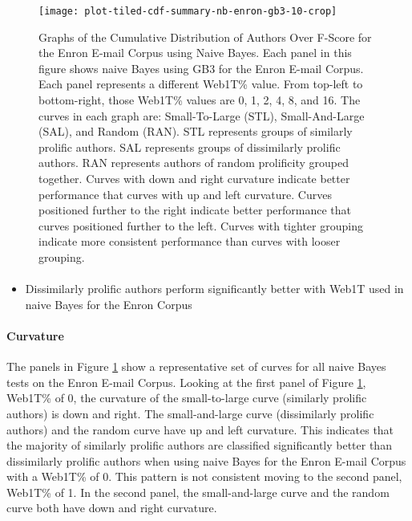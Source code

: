 	\begin{figure}[htbp!]
		\begin{center}
		\centering
		\texttt{[image: plot-tiled-cdf-summary-nb-enron-gb3-10-crop]}
		\caption{Graphs of the Cumulative Distribution of Authors Over F-Score for the Enron E-mail Corpus using Naive Bayes. Each panel in this figure shows naive Bayes using GB3 for the Enron E-mail Corpus.  Each panel represents a different Web1T\% value.  From top-left to bottom-right, those Web1T\% values are 0, 1, 2, 4, 8, and 16.  The curves in each graph are: Small-To-Large (STL), Small-And-Large (SAL), and Random (RAN).  STL represents groups of similarly prolific authors.  SAL represents groups of dissimilarly prolific authors.  RAN represents authors of random prolificity grouped together.  Curves with down and right curvature indicate better performance that curves with up and left curvature.  Curves positioned further to the right indicate better performance that curves positioned further to the left.  Curves with tighter grouping indicate more consistent performance than curves with looser grouping.}
		\label{fig:plot-tiled-cdf-summary-nb-enron-gb3-10}
		\end{center}
	\end{figure}
	
	\paragraph*{}
	\begin{itemize}
	\item Dissimilarly prolific authors perform significantly better with Web1T used in naive Bayes for the Enron Corpus
	\end{itemize}
	\paragraph*{Curvature}The panels in Figure \ref{fig:plot-tiled-cdf-summary-nb-enron-gb3-10} show a representative set of curves for all naive Bayes tests on the Enron E-mail Corpus.  Looking at the first panel of Figure \ref{fig:plot-tiled-cdf-summary-nb-enron-gb3-10}, Web1T\% of 0, the curvature of the small-to-large curve (similarly prolific authors) is down and right.  The small-and-large curve (dissimilarly prolific authors) and the random curve have up and left curvature.  This indicates that the majority of similarly prolific authors are classified significantly better than dissimilarly prolific authors when using naive Bayes for the Enron E-mail Corpus with a Web1T\% of 0.  This pattern is not consistent moving to the second panel, Web1T\% of 1.  In the second panel, the small-and-large curve and the random curve  both have down and right curvature.  
